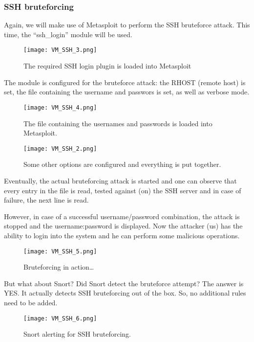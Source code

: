 \subsubsection{SSH bruteforcing}

Again, we will make use of Metasploit to perform the SSH bruteforce attack. This time, the ``ssh\_login'' module will be used.

\begin{figure}[h]
    \centering
    \texttt{[image: VM\_SSH\_3.png]}
    \caption{The required SSH login plugin is loaded into Metasploit}
\end{figure}

The module is configured for the bruteforce attack: the RHOST (remote host) is set, the file containing the username and passwors is set, as well as verbose mode.

\begin{figure}[h]
    \centering
    \texttt{[image: VM\_SSH\_4.png]}
    \caption{The file containing the usernames and passwords is loaded into Metasploit.}
\end{figure}

\begin{figure}[h]
    \centering
    \texttt{[image: VM\_SSH\_2.png]}
    \caption{Some other options are configured and everything is put together.}
\end{figure}
Eventually, the actual bruteforcing attack is started and one can observe that every entry in the file is read, tested against (on) the SSH server and in case of failure, the next line is read.

However, in case of a successful username/password combination, the attack is stopped and the username:password is displayed. Now the attacker (us) has the ability to login into the system and he can perform some malicious operations.
\begin{figure}[h]
    \centering
    \texttt{[image: VM\_SSH\_5.png]}
    \caption{Bruteforcing in action\ldots}
\end{figure}
But what about Snort? Did Snort detect the bruteforce attempt? The answer is YES. It actually detects SSH bruteforcing out of the box. So, no additional rules need to be added.

\begin{figure}[h]
    \centering
    \texttt{[image: VM\_SSH\_6.png]}
    \caption{Snort alerting for SSH bruteforcing.}
\end{figure}

